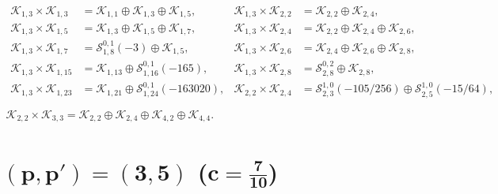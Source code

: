\documentclass[a4paper,reqno,12pt]{report}
\theoremstyle{definition}
\numberwithin{equation}{section}
\newcommand{\Kac}[1]{\mathcal{K}_{#1}}       %
\newcommand{\Stag}[2]{\mathcal{S}_{#1}^{#2}} %
\newcommand{\fuse}{\mathbin{\times}}                                            %
\theoremstyle{plain}
\begin{document}
\begin{equation}
\begin{gathered}
\begin{aligned}
  \Kac{1,3}\fuse \Kac{1,3} &= \Kac{1,1}\oplus \Kac{1,3}\oplus \Kac{1,5}, &
  \Kac{1,3}\fuse \Kac{2,2} &= \Kac{2,2} \oplus \Kac{2,4}, \\
  \Kac{1,3}\fuse \Kac{1,5} &= \Kac{1,3}\oplus \Kac{1,5}\oplus \Kac{1,7}, &
  \Kac{1,3}\fuse \Kac{2,4} &= \Kac{2,2} \oplus \Kac{2,4} \oplus \Kac{2,6}, \\
  \Kac{1,3}\fuse \Kac{1,7} &= \Stag{1,8}{0,1}(-3)\oplus \Kac{1,5}, &
  \Kac{1,3}\fuse \Kac{2,6} &= \Kac{2,4} \oplus \Kac{2,6} \oplus \Kac{2,8}, \\
  \Kac{1,3}\fuse \Kac{1,15} &=\Kac{1,13} \oplus \Stag{1,16}{0,1}(-165), &
  \Kac{1,3}\fuse \Kac{2,8} &= \Stag{2,8}{0,2} \oplus \Kac{2,8}, \\
  \Kac{1,3}\fuse \Kac{1,23} &= \Kac{1,21} \oplus \Stag{1,24}{0,1}(-163020), &
  \Kac{2,2}\fuse \Kac{2,4} &= \Stag{2,3}{1,0}(-105/256) \oplus \Stag{2,5}{1,0}(-15/64), \\
\end{aligned}
\\
  \Kac{2,2}\fuse \Kac{3,3} = \Kac{2,2}\oplus \Kac{2,4} \oplus \Kac{4,2}\oplus \Kac{4,4}.
\end{gathered}
\end{equation}

\medskip

\section*{$\bm{(p,p')=(3,5)}$ ($\bm{c=\frac{7}{10}}$)}
\end{document}
